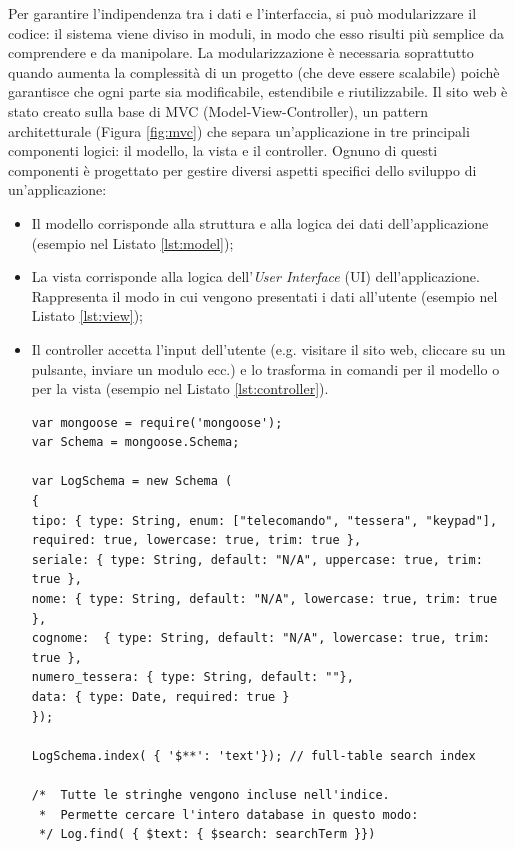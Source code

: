 \documentclass[12pt]{report}
\begin{document}
Per garantire l'indipendenza tra i dati e l'interfaccia, si può modularizzare il codice: il sistema viene diviso in moduli, in modo che esso risulti più semplice da comprendere e da manipolare. La modularizzazione è necessaria soprattutto quando aumenta la complessità di un progetto (che deve essere scalabile) poichè garantisce che ogni parte sia modificabile, estendibile e riutilizzabile.
Il sito web è stato creato sulla base di MVC (Model-View-Controller), un pattern architetturale (Figura \ref{fig:mvc}) che separa un'applicazione in tre principali componenti logici: il modello, la vista e il controller. Ognuno di questi componenti è progettato per gestire diversi aspetti specifici dello sviluppo di un'applicazione:

\begin{itemize}
	\item Il modello corrisponde alla struttura e alla logica dei dati dell'applicazione (esempio nel Listato \ref{lst:model});
	\item La vista corrisponde alla logica dell'\emph{User Interface} (UI) dell'applicazione. Rappresenta il modo in cui vengono presentati i dati all'utente (esempio nel Listato \ref{lst:view}); 
	\item Il controller accetta l'input dell'utente (e.g. visitare il sito web, cliccare su un pulsante, inviare un modulo ecc.) e lo trasforma in comandi per il modello o per la vista (esempio nel Listato \ref{lst:controller}).
	
\begin{lstlisting}[caption={Creazione del modello dei log con \emph{mongoose}}, label={lst:model}, xleftmargin=\dimexpr-\leftmargini]
var mongoose = require('mongoose');
var Schema = mongoose.Schema;

var LogSchema = new Schema (
{
tipo: { type: String, enum: ["telecomando", "tessera", "keypad"], required: true, lowercase: true, trim: true },
seriale: { type: String, default: "N/A", uppercase: true, trim: true },
nome: { type: String, default: "N/A", lowercase: true, trim: true },
cognome:  { type: String, default: "N/A", lowercase: true, trim: true },
numero_tessera: { type: String, default: ""},
data: { type: Date, required: true }
});

LogSchema.index( { '$**': 'text'}); // full-table search index

/*	Tutte le stringhe vengono incluse nell'indice.
 *	Permette cercare l'intero database in questo modo: 
 */	Log.find( { $text: { $search: searchTerm }}) 


\end{lstlisting}
\end{itemize}
\end{document}
